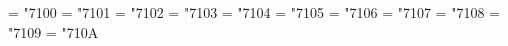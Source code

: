 
\mathchardef\Gamma	= "7100
\mathchardef\Delta	= "7101
\mathchardef\Theta	= "7102
\mathchardef\Lambda	= "7103
\mathchardef\Xi		= "7104
\mathchardef\Pi		= "7105
\mathchardef\Sigma	= "7106
\mathchardef\Upsilon	= "7107
\mathchardef\Phi	= "7108
\mathchardef\Psi	= "7109
\mathchardef\Omega	= "710A
